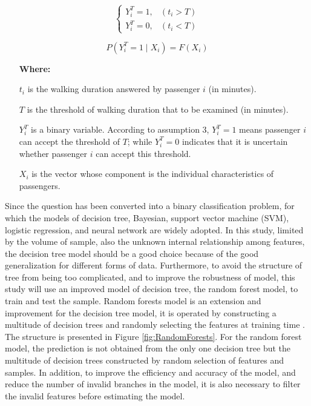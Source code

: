 \documentclass[Journal,letterpaper]{ascelike-new}
\begin{document}
\begin{equation}
\left\{\begin{matrix}
Y^T_i=1,&(t_i>T) \\
Y^T_i=0,&(t_i<T)
\end{matrix}\right.
\label{eq:threshold}
\end{equation}

\begin{equation}
P(Y^T_i=1 \mid X_i)=F(X_i)
\label{eq:probability}
\end{equation}

%
\begin{enumerate}
	\item[\textbf{Where:}]
	\item[$t_i$] is the walking duration answered by passenger $i$ (in minutes).
	\item[$T$] is the threshold of walking duration that to be examined (in minutes).
	\item[$Y^T_i$] is a binary variable. According to assumption 3, $Y^T_i=1$ means passenger $i$ can accept the threshold of $T$; while $Y^T_i=0$ indicates that it is uncertain whether passenger $i$ can accept this threshold.
	\item[$X_i$] is the vector whose component is the individual characteristics of passengers.
\end{enumerate}

%
Since the question has been converted into a binary classification problem, for which the models of decision tree, Bayesian, support vector machine (SVM), logistic regression, and neural network are widely adopted. In this study, limited by the volume of sample, also the unknown internal relationship among features, the decision tree model should be a good choice because of the good generalization for different forms of data. Furthermore, to avoid the structure of tree from being too complicated, and to improve the robustness of model, this study will use an improved model of decision tree, the random forest model, to train and test the sample. Random forests model is an extension and improvement for the decision tree model, it is operated by constructing a multitude of decision trees and randomly selecting the features at training time \cite{ho1995random,ho1998random}. The structure is presented in Figure \ref{fig:RandomForests}. For the random forest model, the prediction is not obtained from the only one decision tree but the multitude of decision trees constructed by random selection of features and samples. In addition, to improve the efficiency and accuracy of the model, and reduce the number of invalid branches in the model, it is also necessary to filter the invalid features before estimating the model.
\end{document}

